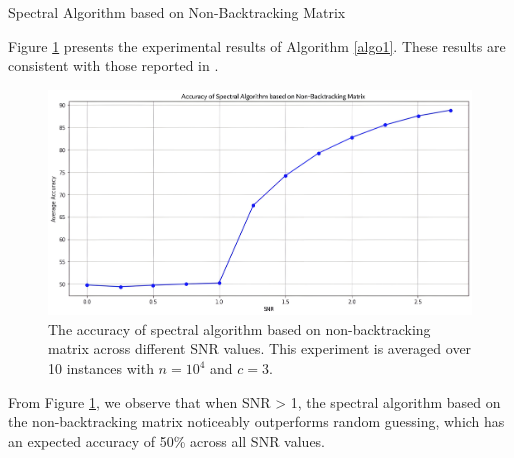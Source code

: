 \begin{algorithm}[H]\label{algo1}
\SetAlgoLined       %
\LinesNumbered
{}
\BlankLine
\caption{Spectral Algorithm based on Non-Backtracking Matrix}
\end{algorithm}
\clearpage
Figure \ref{fig:spec_algo} presents the experimental results of Algorithm \ref{algo1}. These results are consistent with those reported in \cite{the_non-backtracking}.
\begin{figure}[H]
    \centering
    \includegraphics[width=1\linewidth]{Figures/spec_algo.jpg}
    \caption[Accuracy of the Spectral Algorithm based on Non-Backtracking Matrix]{The accuracy of spectral algorithm based on non-backtracking matrix across different SNR values. This experiment is averaged over 10 instances with $n=10^4$ and $c=3.$}
    \label{fig:spec_algo}
\end{figure}
From Figure \ref{fig:spec_algo}, we observe that when SNR > 1, the spectral algorithm based on the non-backtracking matrix noticeably outperforms random guessing, which has an expected accuracy of 50\% across all SNR values.
